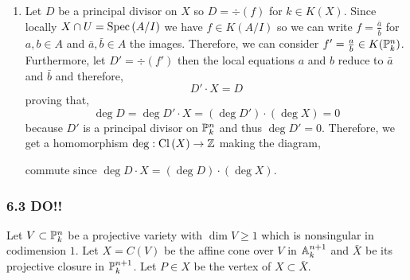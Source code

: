 \documentclass[12pt]{article}
\begin{document}
\begin{enumerate}
\item Let $D$ be a principal divisor on $X$ so $D = \div{(f)}$ for $k \in K(X)$. Since locally $X \cap U = \Spec{A/I}$ we have $f \in K(A/I)$ so we can write $f = \frac{\bar{a}}{\bar{b}}$ for $a, b \in A$ and $\bar{a}, \bar{b} \in A$ the images. Therefore, we can consider $f' = \frac{a}{b} \in K(\P^n_k)$. Furthermore, let $D' = \div{(f')}$ then the local equations $a$ and $b$ reduce to $\bar{a}$ and $\bar{b}$ and therefore,
\[ D' \cdot X = D \]
proving that,
\[ \deg{D} = \deg{D' \cdot X} = (\deg{D'}) \cdot (\deg{X}) = 0 \]
because $D'$ is a principal divisor on $\P^n_k$ and thus $\deg{D'} = 0$. Therefore, we get a homomorphism $\deg : \Cl{X} \to \Z$ making the diagram,
\begin{center}
\end{center}
commute since $\deg{D \cdot X} = (\deg{D}) \cdot (\deg{X})$.
\end{enumerate}

\subsubsection{6.3 DO!!}

Let $V \subset \P^n_k$ be a projective variety with $\dim{V} \ge 1$ which is nonsingular in codimension $1$. Let $X = C(V)$ be the affine cone over $V$ in $\A^{n+1}_k$ and $\bar{X}$ be its projective closure in $\P^{n+1}_k$. Let $P \in X$ be the vertex of $X \subset \bar{X}$. 
\end{document}
